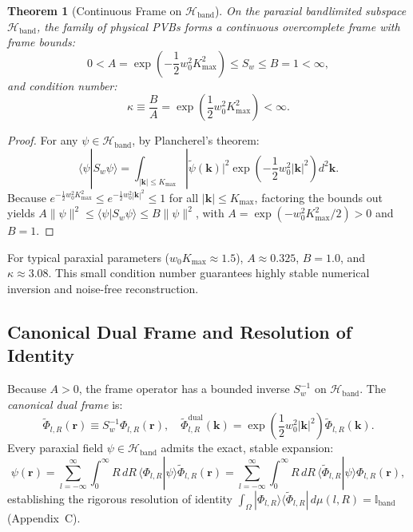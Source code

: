 \documentclass[11pt,a4paper]{article}
\newtheorem{theorem}{Theorem}
\begin{document}
\begin{theorem}[Continuous Frame on $\mathcal{H}_{\text{band}}$]
On the paraxial bandlimited subspace $\mathcal{H}_{\text{band}}$, the family of physical PVBs forms a continuous overcomplete frame with frame bounds:
\begin{equation}
\boxed{0 < A = \exp\left( - \frac{1}{2} w_0^2 K_{\max}^2 \right) \le S_w \le B = 1 < \infty,}
\label{eq:frame_bounds}
\end{equation}
and condition number:
\begin{equation}
\kappa \equiv \frac{B}{A} = \exp\left( \frac{1}{2} w_0^2 K_{\max}^2 \right) < \infty.
\end{equation}
\end{theorem}

\begin{proof}
For any $\psi \in \mathcal{H}_{\text{band}}$, by Plancherel's theorem:
\begin{equation}
\langle \psi | S_w \psi \rangle = \int_{|\mathbf{k}| \le K_{\max}} |\widetilde{\psi}(\mathbf{k})|^2 \exp\left( - \frac{1}{2} w_0^2 |\mathbf{k}|^2 \right) d^2\mathbf{k}.
\end{equation}
Because $e^{-\frac{1}{2} w_0^2 K_{\max}^2} \le e^{-\frac{1}{2} w_0^2 |\mathbf{k}|^2} \le 1$ for all $|\mathbf{k}| \le K_{\max}$, factoring the bounds out yields $A \|\psi\|^2 \le \langle \psi | S_w \psi \rangle \le B \|\psi\|^2$, with $A = \exp(-w_0^2 K_{\max}^2 / 2) > 0$ and $B = 1$.
\end{proof}

For typical paraxial parameters ($w_0 K_{\max} \approx 1.5$), $A \approx 0.325$, $B = 1.0$, and $\kappa \approx 3.08$. This small condition number guarantees highly stable numerical inversion and noise-free reconstruction.

\subsection{Canonical Dual Frame and Resolution of Identity}

Because $A > 0$, the frame operator has a bounded inverse $S_w^{-1}$ on $\mathcal{H}_{\text{band}}$. The \emph{canonical dual frame} is:
\begin{equation}
\widetilde{\Phi}_{l, R}(\mathbf{r}) \equiv S_w^{-1} \Phi_{l, R}(\mathbf{r}), \quad \widetilde{\Phi}_{l, R}^{\text{dual}}(\mathbf{k}) = \exp\left( \frac{1}{2} w_0^2 |\mathbf{k}|^2 \right) \widetilde{\Phi}_{l, R}(\mathbf{k}).
\end{equation}
Every paraxial field $\psi \in \mathcal{H}_{\text{band}}$ admits the exact, stable expansion:
\begin{equation}
\boxed{\psi(\mathbf{r}) = \sum_{l=-\infty}^\infty \int_0^\infty R \, dR \, \langle \Phi_{l, R} | \psi \rangle \widetilde{\Phi}_{l, R}(\mathbf{r}) = \sum_{l=-\infty}^\infty \int_0^\infty R \, dR \, \langle \widetilde{\Phi}_{l, R} | \psi \rangle \Phi_{l, R}(\mathbf{r}),}
\label{eq:dual_expansion}
\end{equation}
establishing the rigorous resolution of identity $\int_\Omega |\Phi_{l, R}\rangle \langle \widetilde{\Phi}_{l, R}| \, d\mu(l, R) = \mathbb{I}_{\text{band}}$ (Appendix~C).
\end{document}
